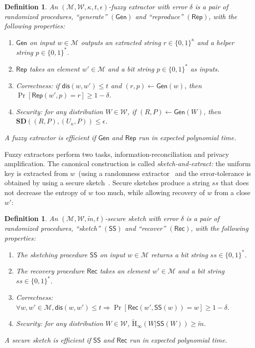 \documentclass[11pt]{article}
\newcommand{\class}[1]{{\ensuremath{\mathsf{#1}}}}
\newcommand{\gen}{\ensuremath{\class{Gen}}\xspace}
\newcommand{\rep}{\ensuremath{\class{Rep}}\xspace}
\newcommand{\sketch}{\ensuremath{\class{SS}}\xspace}
\newcommand{\rec}{\ensuremath{\class{Rec}}\xspace}
\newcommand{\dis}{\ensuremath{\mathsf{dis}}}
\newcommand{\Hav}{\tilde{\mathrm{H}}_\infty}
\newtheorem{definition}[theorem]{Definition}
\begin{document}
\begin{definition}
\label{def:fuzzy extractor}
An $(\mathcal{M}, \mathcal{W}, \kappa, t, \epsilon)$-\emph{fuzzy extractor} with error $\delta$ is a pair of randomized procedures, ``generate'' $(\gen)$ and ``reproduce'' $(\rep)$, with the following properties: 
\begin{enumerate}
\item \gen on input $w\in \mathcal{M}$ outputs an extracted string $r\in\{0,1\}^\kappa$ and a helper string $p\in\{0,1\}^*$.
\item \rep takes an element $w'\in\mathcal{M}$ and a bit string $p\in\{0,1\}^*$ as inputs.   
\item \emph{Correctness:} if $\dis(w, w')\leq t$ and $(r, p)\leftarrow \gen(w)$, then $\Pr[\rep( w', p) = r] \geq 1-\delta$.
\item \emph{Security:} for any distribution $W\in\mathcal{W}$, if $(R,P)\leftarrow\gen (W)$, then $\mathbf{SD}((R,P),(U_\kappa,P))\leq \epsilon$.
\end{enumerate}
A fuzzy extractor is efficient if $\gen$ and $\rep$ run in expected polynomial time.
\end{definition}

\noindent
Fuzzy extractors perform two tasks, information-reconciliation and privacy amplification.  The canonical construction is called \emph{sketch-and-extract:} the uniform key is extracted from $w$~(using a randomness extractor~\cite{nisan1993randomness} and the error-tolerance is obtained by using a secure sketch~\cite[Lemma 4.1]{DBLP:journals/siamcomp/DodisORS08}.  Secure sketches produce a string $ss$ that does not decrease the entropy of $w$ too much, while allowing recovery of $w$ from a  close $w'$:
\begin{definition}
\label{def:secure sketch}
An $(\mathcal{M},\mathcal{W}, \tilde{m}, t)$-\emph{secure sketch} with error $\delta$ is a pair of randomized procedures, ``sketch'' $(\sketch)$ and ``recover'' $(\rec)$, with the following properties:
\begin{enumerate}
\item The sketching procedure \sketch on input $w\in\mathcal{M}$ returns a bit string $ss\in\{0,1\}^*$.
\item The recovery procedure \rec takes an element $w'\in\mathcal{M}$ and a bit string $ss\in\{0,1\}^*$.  
\item \emph{Correctness}: $ \forall w, w'\in\mathcal{M}, \dis(w,w')\leq t \Rightarrow \Pr[\rec(w',\sketch(w))=w]\geq 1-\delta.$
\item \emph{Security}: for any distribution $W\in\mathcal{W}$, $\Hav(W|\sketch(W))\geq \tilde{m}$.
\end{enumerate}
A secure sketch is \emph{efficient} if \sketch and \rec run in expected polynomial time. 
\end{definition}
\end{document}
